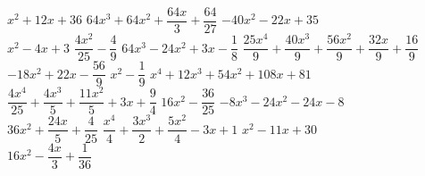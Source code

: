 \begin{esercizio}[*]
\begin{htmulticols}{3}
\begin{enumeratea}
\end{enumeratea}
\end{htmulticols}
\noindent\! \(x^{2} + 12 x + 36\) %
 \(64 x^{3} + 64 x^{2} + \dfrac{64 x}{3} + \dfrac{64}{27}\) %
 \(- 40 x^{2} - 22 x + 35\) \\ %
 \(x^{2} - 4 x + 3\) %
 \(\dfrac{4 x^{2}}{25} - \dfrac{4}{9}\) %
 \(64 x^{3} - 24 x^{2} + 3 x - \dfrac{1}{8}\) %
 \(\dfrac{25 x^{4}}{9} + \dfrac{40 x^{3}}{9} + 
\dfrac{56 x^{2}}{9} + \dfrac{32 x}{9} + \dfrac{16}{9}\) %
 \(- 18 x^{2} + 22 x - \dfrac{56}{9}\) %
 \(x^{2} - \dfrac{1}{9}\) %
 \(x^{4} + 12 x^{3} + 54 x^{2} + 108 x + 81\) %
 \(\dfrac{4 x^{4}}{25} + \dfrac{4 x^{3}}{5} + 
\dfrac{11 x^{2}}{5} + 3x + \dfrac{9}{4}\) %
 \(16 x^{2} - \dfrac{36}{25}\) %
 \(- 8 x^{3} - 24 x^{2} - 24 x - 8\) \\ %
 \(36 x^{2} + \dfrac{24 x}{5} + \dfrac{4}{25}\) %
 \(\dfrac{x^{4}}{4} + \dfrac{3 x^{3}}{2} + \dfrac{5 x^{2}}{4} - 
3 x + 1\) %
 \(x^{2} - 11 x + 30\) \\ %
 \(16 x^{2} - \dfrac{4 x}{3} + \dfrac{1}{36}\) %
\end{esercizio}

